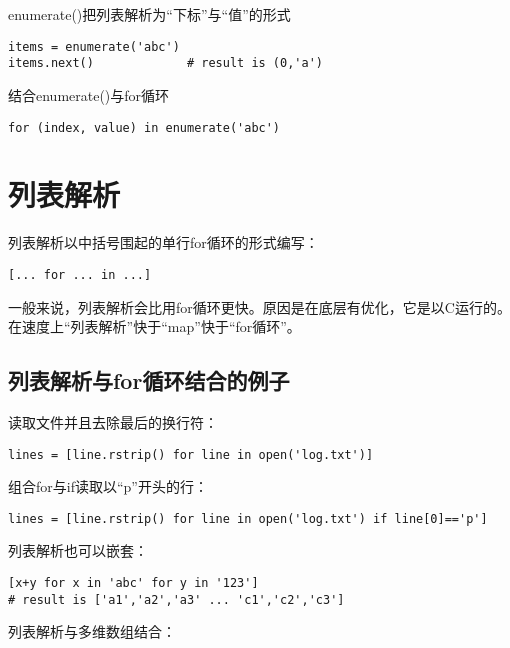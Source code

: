 			enumerate()把列表解析为“下标”与“值”的形式

\begin{lstlisting}
items = enumerate('abc')
items.next()             # result is (0,'a')
\end{lstlisting}

			结合enumerate()与for循环

\begin{lstlisting}
for (index, value) in enumerate('abc')
\end{lstlisting}

	\section{列表解析}

		列表解析以中括号围起的单行for循环的形式编写：

\begin{lstlisting}
[... for ... in ...]
\end{lstlisting}

		一般来说，列表解析会比用for循环更快。原因是在底层有优化，它是以C运行的。在速度上“列表解析”快于“map”快于“for循环”。

		\subsection{列表解析与for循环结合的例子}
			
			读取文件并且去除最后的换行符：

\begin{lstlisting}
lines = [line.rstrip() for line in open('log.txt')]
\end{lstlisting}

			组合for与if读取以“p”开头的行：

\begin{lstlisting}
lines = [line.rstrip() for line in open('log.txt') if line[0]=='p'] 
\end{lstlisting}

			列表解析也可以嵌套：

\begin{lstlisting}
[x+y for x in 'abc' for y in '123']
# result is ['a1','a2','a3' ... 'c1','c2','c3']
\end{lstlisting}

			列表解析与多维数组结合：

			
